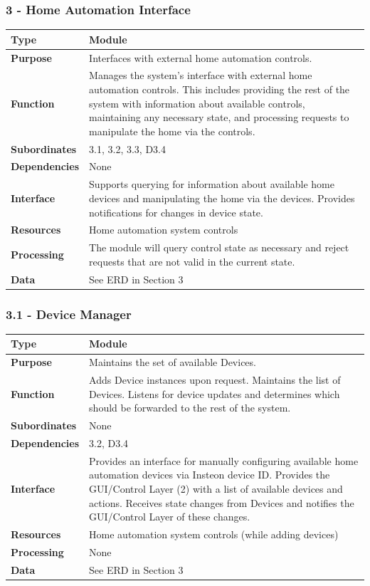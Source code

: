 \documentclass{article}
\begin{document}
\subsubsection*{3 - Home Automation Interface}
\begin{tabular}{ | l |  p{13.3cm} |}
\hline
\textbf{Type} & Module \\ \hline
\textbf{Purpose} & Interfaces with external home automation controls. \\ \hline
\textbf{Function} & Manages the system's interface with external home
automation controls. This includes providing the rest of the system with
information about available controls, maintaining any necessary state, and
processing requests to manipulate the home via the controls. \\ \hline
\textbf{Subordinates} & 3.1, 3.2, 3.3, D3.4 \\ \hline
\textbf{Dependencies} & None \\ \hline
\textbf{Interface} & Supports querying for information about available home
devices and manipulating the home via the devices. Provides notifications for
changes in device state. \\ \hline
\textbf{Resources} & Home automation system controls \\ \hline
\textbf{Processing} & The module will query control state as necessary and
reject requests that are not valid in the current state. \\ \hline
\textbf{Data} & See ERD in Section 3 \\ \hline
\end{tabular}

\subsubsection*{3.1 - Device Manager}
\begin{tabular}{ | l |  p{13.3cm} |}
\hline
\textbf{Type} & Module \\ \hline
\textbf{Purpose} & Maintains the set of available Devices. \\ \hline
\textbf{Function} & Adds Device instances upon request. Maintains the list of
Devices. Listens for device updates and determines which should be forwarded
to the rest of the system. \\ \hline
\textbf{Subordinates} & None \\ \hline
\textbf{Dependencies} & 3.2, D3.4 \\ \hline
\textbf{Interface} & Provides an interface for manually configuring available
home automation devices via Insteon device ID. Provides the GUI/Control Layer
(2) with a list of available devices and actions. Receives state changes from
Devices and notifies the GUI/Control Layer of these changes. \\ \hline
\textbf{Resources} & Home automation system controls (while adding devices) \\ \hline
\textbf{Processing} & None \\ \hline
\textbf{Data} & See ERD in Section 3 \\ \hline
\end{tabular}
\end{document}

